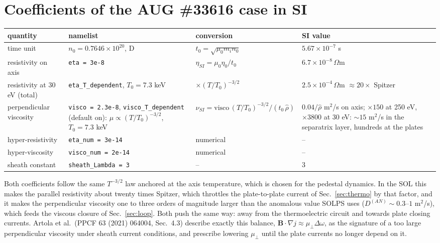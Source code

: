 \documentclass[11pt,a4paper]{article}
\newcommand{\bB}{\mathbf{B}}
\newcommand{\code}[1]{\texttt{#1}}
\begin{document}
\section{Coefficients of the AUG \#33616 case in SI}
\label{sec:coef}

\begin{center}
\small
\begin{tabular}{p{3.3cm}p{3.4cm}p{3.6cm}p{4.6cm}}
\toprule
quantity & namelist & conversion & SI value \\
\midrule
time unit & $n_0 = 0.7646\times10^{20}$, D & $t_0 = \sqrt{\mu_0 m_i n_0}$ & $5.67\times10^{-7}$ s \\
resistivity on axis & \code{eta = 3e-8} & $\eta_{SI} = \mu_0\eta_0/t_0$ & $6.7\times10^{-8}\,\Omega$m \\
resistivity at 30 eV (total) & \code{eta\_T\_dependent}, $T_0 = 7.3$ keV & $\times(T/T_0)^{-3/2}$ & $2.5\times10^{-4}\,\Omega$m $\approx 20\times$ Spitzer \\
perpendicular viscosity & \code{visco = 2.3e-8}, \code{visco\_T\_dependent} (default on): $\mu\propto(T/T_0)^{-3/2}$, $T_0 = 7.3$ keV & $\nu_{SI} = \mathrm{visco}\,(T/T_0)^{-3/2}/(t_0\,\hat\rho)$ & $0.04/\hat\rho$ m$^2$/s on axis; $\times150$ at 250 eV, $\times3800$ at 30 eV: $\sim15$ m$^2$/s in the separatrix layer, hundreds at the plates \\
hyper-resistivity & \code{eta\_num = 3e-14} & numerical & -- \\
hyper-viscosity & \code{visco\_num = 2e-14} & numerical & -- \\
sheath constant & \code{sheath\_Lambda = 3} & -- & 3 \\
\bottomrule
\end{tabular}
\end{center}
Both coefficients follow the same $T^{-3/2}$ law anchored at the axis temperature, which is chosen for the pedestal
dynamics. In the SOL this makes the parallel resistivity about twenty times Spitzer, which throttles the plate-to-plate
current of Sec.~\ref{sec:thermo} by that factor, and it makes the perpendicular viscosity one to three orders of
magnitude larger than the anomalous value SOLPS uses ($D^{(AN)}\sim0.3$--$1$ m$^2$/s), which feeds the viscous closure
of Sec.~\ref{sec:loop}. Both push the same way: away from the thermoelectric circuit and towards plate closing currents.
Artola et al.\ (PPCF 63 (2021) 064004, Sec.~4.3) describe exactly this balance, $\bB\cdot\nabla j \approx \mu_\perp\Delta\omega$,
as the signature of a too large perpendicular viscosity under sheath current conditions, and prescribe lowering $\mu_\perp$
until the plate currents no longer depend on it.
\end{document}
